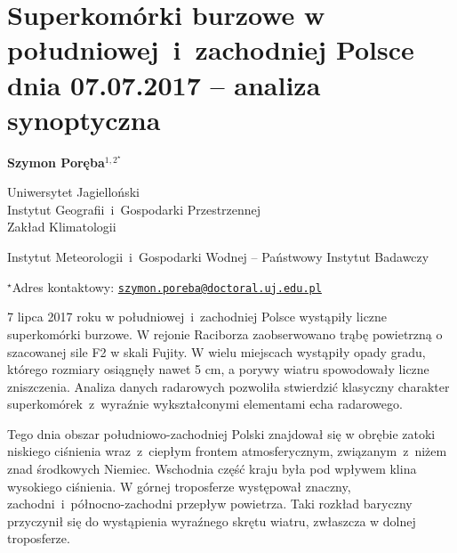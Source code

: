 \documentclass[\main/boa.tex]{subfiles}
\begin{document}
\sloppy

\section{Superkomórki burzowe w południowej~i~zachodniej Polsce dnia 07.07.2017 – analiza synoptyczna}

\begin{center}
  {\bf {} Szymon Poręba$^{1,2^\star}$}
\end{center}

\vskip 0.3cm

\begin{affiliations}
\begin{enumerate}
\begin{minipage}{0.915\textwidth}
\centering
\item Uniwersytet Jagielloński\\ Instytut Geografii~i~Gospodarki Przestrzennej\\ Zakład Klimatologii
\\[-2pt]
\item Instytut Meteorologii~i~Gospodarki Wodnej -- Państwowy Instytut Badawczy \\[-2pt]
\end{minipage}
\end{enumerate}
$^\star$Adres kontaktowy: \href{mailto:szymon.poreba@doctoral.uj.edu.pl}{\nolinkurl{szymon.poreba@doctoral.uj.edu.pl}}\\
\end{affiliations}

\vskip 0.5cm


\vskip 0.5cm

7 lipca 2017 roku w południowej~i~zachodniej Polsce wystąpiły liczne superkomórki burzowe. W rejonie Raciborza zaobserwowano trąbę powietrzną o szacowanej sile F2 w skali Fujity.  W wielu miejscach wystąpiły opady gradu, którego rozmiary osiągnęły nawet 5 cm, a porywy wiatru spowodowały liczne zniszczenia. Analiza danych radarowych pozwoliła stwierdzić klasyczny charakter superkomórek~z~wyraźnie wykształconymi elementami echa radarowego. 

Tego dnia obszar południowo-zachodniej Polski znajdował się w obrębie zatoki niskiego ciśnienia wraz~z~ciepłym frontem atmosferycznym, związanym~z~niżem znad środkowych Niemiec. Wschodnia część kraju była pod wpływem  klina wysokiego ciśnienia. W górnej troposferze występował znaczny, zachodni~i~północno-zachodni przepływ powietrza. Taki rozkład baryczny przyczynił się do wystąpienia wyraźnego skrętu wiatru, zwłaszcza w dolnej troposferze. 
\end{document}
